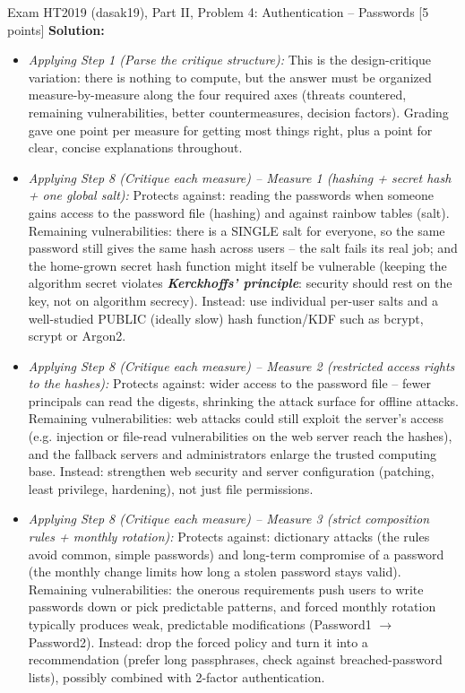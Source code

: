 \documentclass[12pt, a4paper]{article}
\newcommand{\term}[1]{\textbf{\textit{#1}}}        %
\begin{document}
\begin{practicebox}{Exam HT2019 (dasak19), Part II, Problem 4: Authentication -- Passwords [5 points]}
\textbf{Solution:}
\begin{itemize}
    \item \textit{Applying Step 1 (Parse the critique structure):} This is the design-critique variation: there is nothing to compute, but the answer must be organized measure-by-measure along the four required axes (threats countered, remaining vulnerabilities, better countermeasures, decision factors). Grading gave one point per measure for getting most things right, plus a point for clear, concise explanations throughout.
    \item \textit{Applying Step 8 (Critique each measure) -- Measure 1 (hashing + secret hash + one global salt):} Protects against: reading the passwords when someone gains access to the password file (hashing) and against rainbow tables (salt). Remaining vulnerabilities: there is a SINGLE salt for everyone, so the same password still gives the same hash across users -- the salt fails its real job; and the home-grown secret hash function might itself be vulnerable (keeping the algorithm secret violates \term{Kerckhoffs' principle}: security should rest on the key, not on algorithm secrecy). Instead: use individual per-user salts and a well-studied PUBLIC (ideally slow) hash function/KDF such as bcrypt, scrypt or Argon2.
    \item \textit{Applying Step 8 (Critique each measure) -- Measure 2 (restricted access rights to the hashes):} Protects against: wider access to the password file -- fewer principals can read the digests, shrinking the attack surface for offline attacks. Remaining vulnerabilities: web attacks could still exploit the server's access (e.g. injection or file-read vulnerabilities on the web server reach the hashes), and the fallback servers and administrators enlarge the trusted computing base. Instead: strengthen web security and server configuration (patching, least privilege, hardening), not just file permissions.
    \item \textit{Applying Step 8 (Critique each measure) -- Measure 3 (strict composition rules + monthly rotation):} Protects against: dictionary attacks (the rules avoid common, simple passwords) and long-term compromise of a password (the monthly change limits how long a stolen password stays valid). Remaining vulnerabilities: the onerous requirements push users to write passwords down or pick predictable patterns, and forced monthly rotation typically produces weak, predictable modifications (Password1 $\rightarrow$ Password2). Instead: drop the forced policy and turn it into a recommendation (prefer long passphrases, check against breached-password lists), possibly combined with 2-factor authentication.

\end{itemize}
\end{practicebox}
\end{document}
